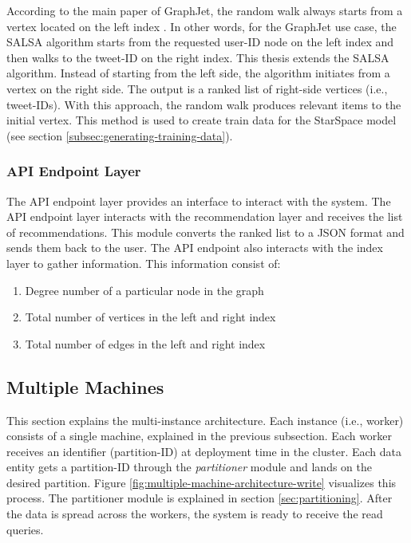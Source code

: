 According to the main paper of GraphJet, the random walk always starts from a vertex located on the left index \cite{sharmaGraphJetRealtimeContent2016}. In other words, for the GraphJet use case, the SALSA algorithm starts from the requested user-ID node on the left index and then walks to the tweet-ID on the right index. This thesis extends the SALSA algorithm. Instead of starting from the left side, the algorithm initiates from a vertex on the right side. The output is a ranked list of right-side vertices (i.e., tweet-IDs). With this approach, the random walk produces relevant items to the initial vertex. This method is used to create train data for the StarSpace model (see section \ref{subsec:generating-training-data}).

\subsubsection{API Endpoint Layer}
\label{subsubsec:api-endpoint-layer}
The API endpoint layer provides an interface to interact with the system. The API endpoint layer interacts with the recommendation layer and receives the list of recommendations. This module converts the ranked list to a JSON format and sends them back to the user.
The API endpoint also interacts with the index layer to gather information. This information consist of:

\begin{enumerate}
    \item Degree number of a particular node in the graph
    \item Total number of vertices in the left and right index
    \item Total number of edges in the left and right index
\end{enumerate}

\subsection{Multiple Machines}
\label{subsec:multiple-machines}
This section explains the multi-instance architecture. Each instance (i.e., worker) consists of a single machine, explained in the previous subsection. Each worker receives an identifier (partition-ID) at deployment time in the cluster. Each data entity gets a partition-ID through the \emph{partitioner} module and lands on the desired partition. Figure \ref{fig:multiple-machine-architecture-write} visualizes this process. The partitioner module is explained in section \ref{sec:partitioning}. After the data is spread across the workers, the system is ready to receive the read queries. 



